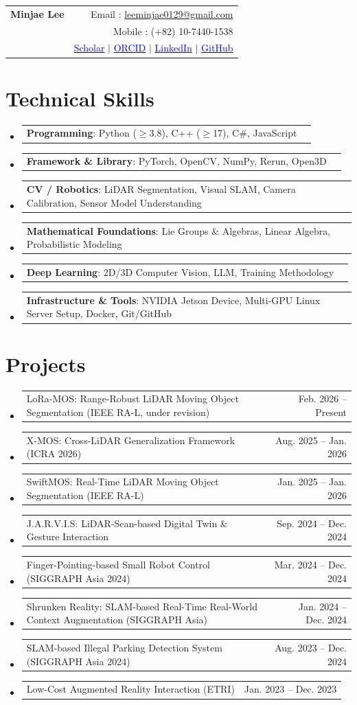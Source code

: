 \documentclass[letterpaper,11pt]{article}
\makeatletter
\newcommand{\resumeSkills}[1]{
  \item\small{
    \begin{tabular*}{0.97\textwidth}[t]{l@{\extracolsep{\fill}}r}
      #1
    \end{tabular*}\vspace{-2pt}
  }
}
\newcommand{\resumeSubHeadingListStart}{\begin{itemize}[leftmargin=*]}
\newcommand{\resumeSubHeadingListEnd}{\end{itemize}}
\makeatother
\begin{document}
\begin{tabular*}{\textwidth}{l@{\extracolsep{\fill}}r}
  \textbf{{\Large Minjae Lee}} & Email : \href{mailto:leeminjae0129@gmail.com}{leeminjae0129@gmail.com} \\
  {} & Mobile : (+82) 10-7440-1538 \\
  {} & \href{https://scholar.google.com/citations?user=Ohcu4AwAAAAJ}{\textcolor{blue}{Scholar}} $|$ \href{https://orcid.org/0009-0005-2796-3207}{\textcolor{blue}{ORCID}} $|$ \href{https://www.linkedin.com/in/minjae-lee-9122bb252/}{\textcolor{blue}{LinkedIn}} $|$ \href{https://github.com/MinChoi0129}{\textcolor{blue}{GitHub}}
\end{tabular*}

\section{Technical Skills}
\resumeSubHeadingListStart
\resumeSkills{\textbf{Programming}: Python ($\geq$3.8), C++ ($\geq$17), C\#, JavaScript}
\resumeSkills{\textbf{Framework \& Library}: PyTorch, OpenCV, NumPy, Rerun, Open3D}
\resumeSkills{\textbf{CV / Robotics}: LiDAR Segmentation, Visual SLAM, Camera Calibration, Sensor Model Understanding}
\resumeSkills{\textbf{Mathematical Foundations}: Lie Groups \& Algebras, Linear Algebra, Probabilistic Modeling}
\resumeSkills{\textbf{Deep Learning}: 2D/3D Computer Vision, LLM, Training Methodology}
\resumeSkills{\textbf{Infrastructure \& Tools}: NVIDIA Jetson Device, Multi-GPU Linux Server Setup, Docker, Git/GitHub}
\resumeSubHeadingListEnd

\section{Projects}
\resumeSubHeadingListStart
\resumeSkills{LoRa-MOS: Range-Robust LiDAR Moving Object Segmentation (IEEE RA-L, under revision) & Feb. 2026 -- Present}
\resumeSkills{X-MOS: Cross-LiDAR Generalization Framework (ICRA 2026) & Aug. 2025 -- Jan. 2026}
\resumeSkills{SwiftMOS: Real-Time LiDAR Moving Object Segmentation (IEEE RA-L) & Jan. 2025 -- Jan. 2026}
\resumeSkills{J.A.R.V.I.S: LiDAR-Scan-based Digital Twin \& Gesture Interaction & Sep. 2024 -- Dec. 2024}
\resumeSkills{Finger-Pointing-based Small Robot Control (SIGGRAPH Asia 2024) & Mar. 2024 -- Dec. 2024}
\resumeSkills{{\footnotesize Shrunken Reality: SLAM-based Real-Time Real-World Context Augmentation (SIGGRAPH Asia)} & Jan. 2024 -- Dec. 2024}
\resumeSkills{SLAM-based Illegal Parking Detection System (SIGGRAPH Asia 2024) & Aug. 2023 -- Dec. 2024}
\resumeSkills{Low-Cost Augmented Reality Interaction (ETRI) & Jan. 2023 -- Dec. 2023}
\resumeSubHeadingListEnd
\end{document}
